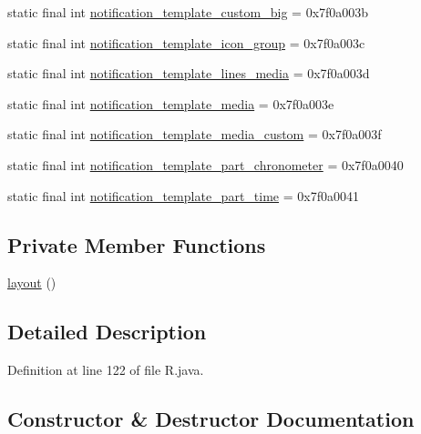 \begin{DoxyCompactItemize}
static final int \mbox{\hyperlink{classandroid_1_1support_1_1mediacompat_1_1_r_1_1layout_a7cfbf2cf8fead47542cc3d9f6fa76af3}{notification\+\_\+template\+\_\+custom\+\_\+big}} = 0x7f0a003b
\item 
static final int \mbox{\hyperlink{classandroid_1_1support_1_1mediacompat_1_1_r_1_1layout_a39993db7633151eb09a67e32ea638006}{notification\+\_\+template\+\_\+icon\+\_\+group}} = 0x7f0a003c
\item 
static final int \mbox{\hyperlink{classandroid_1_1support_1_1mediacompat_1_1_r_1_1layout_ade9024eff004c3faddcf47d74582dfe8}{notification\+\_\+template\+\_\+lines\+\_\+media}} = 0x7f0a003d
\item 
static final int \mbox{\hyperlink{classandroid_1_1support_1_1mediacompat_1_1_r_1_1layout_ad4b1b9880ac48b0cdd66684e80bfa97c}{notification\+\_\+template\+\_\+media}} = 0x7f0a003e
\item 
static final int \mbox{\hyperlink{classandroid_1_1support_1_1mediacompat_1_1_r_1_1layout_ad030dc38912f4e9d3d6220e962a42065}{notification\+\_\+template\+\_\+media\+\_\+custom}} = 0x7f0a003f
\item 
static final int \mbox{\hyperlink{classandroid_1_1support_1_1mediacompat_1_1_r_1_1layout_acf044bc944b7a154c52653891074c05c}{notification\+\_\+template\+\_\+part\+\_\+chronometer}} = 0x7f0a0040
\item 
static final int \mbox{\hyperlink{classandroid_1_1support_1_1mediacompat_1_1_r_1_1layout_ac483500984025c7db556bf3c6d4cfc49}{notification\+\_\+template\+\_\+part\+\_\+time}} = 0x7f0a0041
\end{DoxyCompactItemize}
\subsection*{Private Member Functions}
\begin{DoxyCompactItemize}
\item 
\mbox{\hyperlink{classandroid_1_1support_1_1mediacompat_1_1_r_1_1layout_acf0c03b8b9c7a793fa6be4b563fbfb22}{layout}} ()
\end{DoxyCompactItemize}


\subsection{Detailed Description}


Definition at line 122 of file R.\+java.



\subsection{Constructor \& Destructor Documentation}
\mbox{\label{classandroid_1_1support_1_1mediacompat_1_1_r_1_1layout_acf0c03b8b9c7a793fa6be4b563fbfb22}} 
